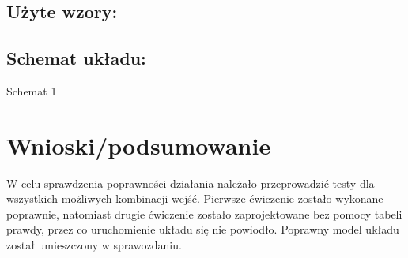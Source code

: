 \documentclass[12pt,a4paper]{article}
\begin{document}
		
		\subsection{Użyte wzory:}
		
		
		\subsection{Schemat układu:}
		
		\vspace{1.5cm}
		\begin{center}
			Schemat 1
		\end{center}

	\section{Wnioski/podsumowanie}
	
			W celu sprawdzenia poprawności działania należało przeprowadzić testy dla wszystkich możliwych kombinacji wejść. Pierwsze ćwiczenie zostało wykonane poprawnie, natomiast drugie ćwiczenie zostało zaprojektowane bez pomocy tabeli prawdy, przez co uruchomienie układu się nie powiodło. Poprawny model układu został umieszczony w sprawozdaniu.
	
\end{document}
